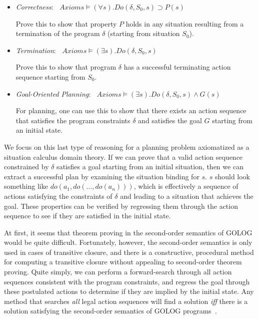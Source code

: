 \begin{itemize}

\item \emph{Correctness}: $\; \; Axioms \vDash (\forall s).Do(\delta,S_0,s) \supset P(s)$

Prove this to show that property $P$ holds in any situation
resulting from a termination of the program $\delta$ (starting from
situation $S_0$).

\item \emph{Termination}: $\; \; Axioms \vDash (\exists s).Do(\delta,S_0,s)$

Prove this to show that program $\delta$ has a successful terminating action sequence
starting from $S_0$.

\item \emph{Goal-Oriented Planning}: $\; \; Axioms \vDash (\exists s).Do(\delta,S_0,s) \wedge G(s)$

For planning, one can use this to show that there exists an action
sequence that satisfies the program constraints $\delta$ and satisfies
the goal $G$ starting from an initial state.  

\end{itemize}

We focus on this last type of reasoning for a planning problem axiomatized
as a situation calculus domain theory.  If we can prove that 
a valid action sequence constrained by $\delta$ satisfies a goal
starting from an initial situation, then we can extract a successful
plan by examining the situation binding for $s$.  $s$ should look
something like $do(a_1,do(\ldots,do(a_n)))$, which is
effectively a sequence of actions satisfying the constraints of
$\delta$ and leading to a situation that achieves the goal.  These properties
can be verified by regressing them through the action sequence to
see if they are satisfied in the initial state.

At first, it seems that theorem proving in the second-order semantics
of GOLOG would be quite difficult.  Fortunately, however, the second-order
semantics is only used in cases of transitive closure, and there is
a constructive, procedural method for computing a transitive closure
without appealing to second-order theorem proving.  Quite simply, we can
perform a forward-search through all action sequences consistent
with the program constraints, and regress the goal through these postulated
actions to determine if they are implied by the initial state.  Any 
method that searches \emph{all} legal action sequences will find a solution \emph{iff}
there is a solution satisfying the second-order semantics of GOLOG programs~\cite{golog}.

